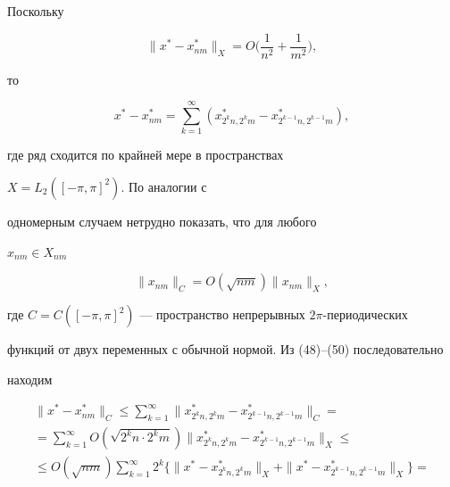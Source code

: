 \begin{pf} 


Поскольку 


\begin{equation} 


\|x^*-x^*_{nm}\|_X=O\bigg(\frac{1}{n^2}+\frac{1}{m^2} \bigg), 


\end{equation} 


то 


\begin{equation} 


x^*-x^*_{nm}=\sum^\infty_{k=1}(x^*_{2^k n,2^k m}- 


x^*_{2^{k-1}n,2^{k-1}m}), 


\end{equation} 


где ряд сходится по крайней мере в пространствах 


$X=L_2([-\pi,\pi]^2)$. По аналогии с 


одномерным случаем \cite{5} нетрудно показать, что для любого 


$x_{nm}\in X_{nm}$ 


\begin{equation} 


\|x_{nm}\|_C=O(\sqrt{nm})\|x_{nm}\|_X, 


\end{equation} 


где $C=C([-\pi,\pi]^2)$ --- пространство непрерывных $2\pi$-периодических 


функций от двух переменных с обычной нормой. Из (48)--(50) последовательно 


находим 


\begin{multline} 


\|x^*-x^*_{nm}\|_C\le\sum^\infty_{k=1} 


\|x^*_{2^k n,2^k m}-x^*_{2^{k-1}n,2^{k-1}m}\|_C = \\ 


% 


=\sum^\infty_{k=1}O(\sqrt{2^k n\cdot 2^k m}) 


\|x^*_{2^k n,2^k m}-x^*_{2^{k-1}n,2^{k-1}m}\|_X\le \\ 


% 


\le O(\sqrt{nm})\sum^\infty_{k=1}2^k\{\| 


x^*-x^*_{2^k n,2^k m}\|_X+\|x^*-x^*_{2^{k-1}n,2^{k-1}m}\|_X\} = \\ 



\end{multline}
\end{pf}
